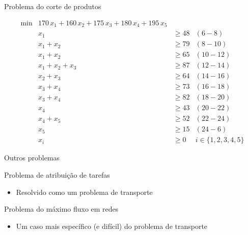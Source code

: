 \documentclass[compress,mathserif]{beamer}
\begin{document}
\begin{frame}{Problema do corte de produtos}

$$\begin{matrix}
        \min & 170\,x_1 + 160\,x_2 + 175\,x_3 + 180\,x_4 + 195\,x_5\\  
             & x_1             & \geq 48 & (6-8) \\ 
             & x_1 + x_2       & \geq 79 & (8-10) \\ 
             & x_1 + x_2       & \geq 65 & (10-12) \\ 
             & x_1 + x_2 + x_3 & \geq 87 & (12-14) \\ 
             & x_2 + x_3       & \geq 64 & (14-16) \\ 
             & x_3 + x_4       & \geq 73 & (16-18) \\ 
             & x_3 + x_4       & \geq 82 & (18-20) \\ 
             & x_4             & \geq 43 & (20-22) \\ 
             & x_4 + x_5       & \geq 52 & (22-24) \\ 
             & x_5             & \geq 15 & (24-6) \\ 
             & x_i & \geq 0 & i \in \{1, 2, 3, 4, 5\}
        \end{matrix}    
$$

\end{frame}


\begin{frame}{Outros problemas}


Problema de atribuição de tarefas
\begin{itemize}
    \item Resolvido como um problema de transporte
\end{itemize}

\vspace{1cm}

Problema do máximo fluxo em redes
\begin{itemize}
    \item Um caso mais específico (e difícil) do problema de transporte
\end{itemize}


\end{frame}
\end{document}
